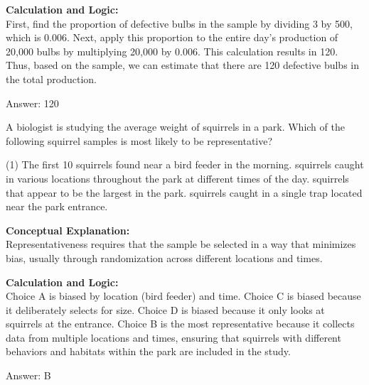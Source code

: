 \documentclass[11pt,paper=a4,answers]{exam}
\begin{document}
\begin{questions}
\begin{solution}
\textbf{Calculation and Logic:} \\
First, find the proportion of defective bulbs in the sample by dividing 3 by 500, which is 0.006. Next, apply this proportion to the entire day's production of 20,000 bulbs by multiplying 20,000 by 0.006. This calculation results in 120. Thus, based on the sample, we can estimate that there are 120 defective bulbs in the total production.

\vspace{30pt}

Answer: \colorbox{yellow!100}{120}
\end{solution}

\vspace{60pt}

\question
A biologist is studying the average weight of squirrels in a park. Which of the following squirrel samples is most likely to be representative?
\begin{tasks}(1)
    \task The first 10 squirrels found near a bird feeder in the morning.
     squirrels caught in various locations throughout the park at different times of the day.
     squirrels that appear to be the largest in the park.
     squirrels caught in a single trap located near the park entrance.
\end{tasks}

\begin{solution}
\textbf{Conceptual Explanation:} \\
Representativeness requires that the sample be selected in a way that minimizes bias, usually through randomization across different locations and times.

\vspace{30pt}

\textbf{Calculation and Logic:} \\
Choice A is biased by location (bird feeder) and time. Choice C is biased because it deliberately selects for size. Choice D is biased because it only looks at squirrels at the entrance. Choice B is the most representative because it collects data from multiple locations and times, ensuring that squirrels with different behaviors and habitats within the park are included in the study.

\vspace{30pt}

Answer: \colorbox{yellow!100}{B}
\end{solution}


\end{questions}
\end{document}
